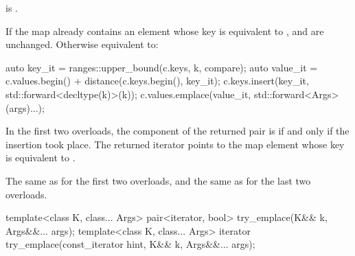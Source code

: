 \begin{itemdescr}
\pnum
\constraints
{} is .

\pnum
\effects
If the map already contains an element whose key is equivalent to ,
 and  are unchanged.
Otherwise equivalent to:
\begin{codeblock}
auto key_it = ranges::upper_bound(c.keys, k, compare);
auto value_it = c.values.begin() + distance(c.keys.begin(), key_it);
c.keys.insert(key_it, std::forward<decltype(k)>(k));
c.values.emplace(value_it, std::forward<Args>(args)...);
\end{codeblock}

\pnum
\returns
In the first two overloads,
the  component of the returned pair is 
if and only if the insertion took place.
The returned iterator points to the map element
whose key is equivalent to .

\pnum
\complexity
The same as  for the first two overloads, and
the same as  for the last two overloads.
\end{itemdescr}

%
\begin{itemdecl}
template<class K, class... Args>
  pair<iterator, bool> try_emplace(K&& k, Args&&... args);
template<class K, class... Args>
  iterator try_emplace(const_iterator hint, K&& k, Args&&... args);
\end{itemdecl}

